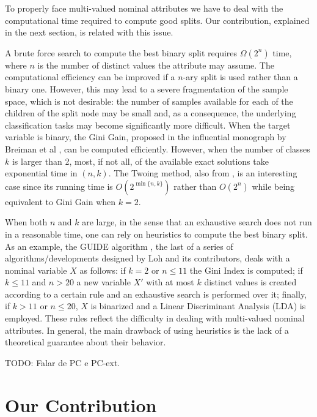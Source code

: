 To properly face  multi-valued nominal attributes we have to deal with the computational time required to compute good splits.
Our contribution, explained in the next section, is related with this issue. 
 
A brute force search to compute the best binary split 
requires $\Omega(2^n)$ time, where $n$ is the number of distinct values the attribute may assume. The computational efficiency can be improved if a $n$-ary split is used rather than a binary one. However,  this may lead to a severe fragmentation of the sample space, which is not desirable: the number of samples available for each of the children of the split node 
may be small and, as a consequence, the underlying classification tasks may become significantly more difficult.
When the target variable is binary, the Gini Gain, proposed
in the influential monograph by Breiman et al \cite{Breiman84}, can be computed efficiently.
However, when the number of classes $k$ is larger than 2,
most, if not all, of the available exact solutions take exponential time
in $(n,k)$.
The Twoing method, also from \cite{Breiman84}, 
is an  interesting case since its running time is $O(2^{\min\{n,k\}})$ rather than $O( 2^ n)$ while being equivalent to
Gini Gain when $k=2$.

When both $n$ and $k$ are large, in the sense that an exhaustive search does not run in a reasonable time, one can rely on heuristics to compute the best binary split.
As an example, the GUIDE algorithm  \cite{Loh2009}, the  last
of a series of algorithms/developments designed by Loh and its contributors, 
deals with a nominal variable $X$
as follows: if $k=2$ or $n \le 11$ the Gini Index is computed;
if $k \le 11$ and $n > 20$ a new variable $X'$ with at most $k$ distinct values is created according to a certain rule and an exhaustive search is performed over it;  finally, if $k > 11$ or $n \le 20$,  $X$ is binarized and a Linear Discriminant Analysis (LDA) is employed.
These rules reflect the difficulty in dealing with multi-valued nominal attributes.
In general, the main drawback of using heuristics is the lack of a theoretical guarantee about their behavior. 

TODO: Falar de PC e PC-ext.

\section{Our Contribution}
\label{sec:contribution}

